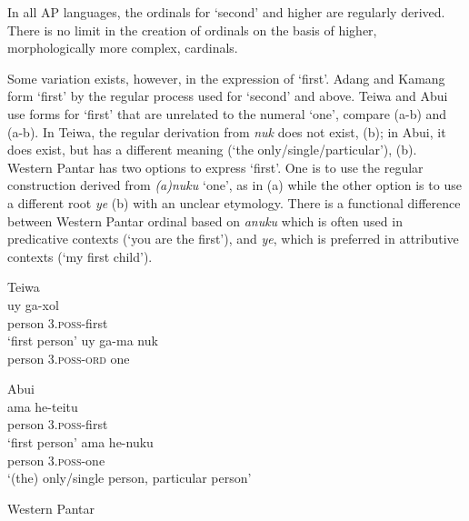 In all AP languages, the ordinals for `second' and higher are regularly derived. There is no limit in the creation of ordinals on the basis of higher, morphologically more complex, cardinals.

Some variation exists, however, in the expression of `first'. Adang and Kamang form `first' by the regular process used for `second' and above. Teiwa and Abui use forms for `first' that are unrelated to the numeral `one', compare  (a-b) and  (a-b). In Teiwa, the regular derivation from \textit{nuk} does not exist, (b); in Abui, it does exist, but has a different meaning (`the only/single/particular'), (b). Western Pantar has two options to express `first'. One is to use the regular construction derived from \textit{(a)nuku} `one', as in (a) while the other option is to use a different root \textit{ye} (b) with an unclear etymology. There is a functional difference between Western Pantar ordinal based on \textit{anuku} which is often used in predicative contexts (`you are the first'), and \textit{ye}, which is preferred in attributive contexts (`my first child'). 


\ea%
\label{bkm:Ref342651040}
{\upshape Teiwa}\\
\ea
\gll  uy    ga-xol \\  
     person    3\textsc{.poss}-first\\
\glt`first person'
\ex
\gll *uy    ga-ma    nuk\\
person    3\textsc{.poss-ord} one\\ 
\z\z
 


\ea%
\label{bkm:Ref342651068}
{\upshape Abui}\\
\ea
\gll ama     he-teitu\\  
    person    3\textsc{.poss}-first  \\
\glt`first person'
\ex
\gll ama     he-nuku\\  
  person    3\textsc{.poss}-one  \\
\glt `(the) only/single person,  particular person'
\z\z

 


\ea%
\label{bkm:Ref342651067}
{\upshape Western Pantar}\\
 
